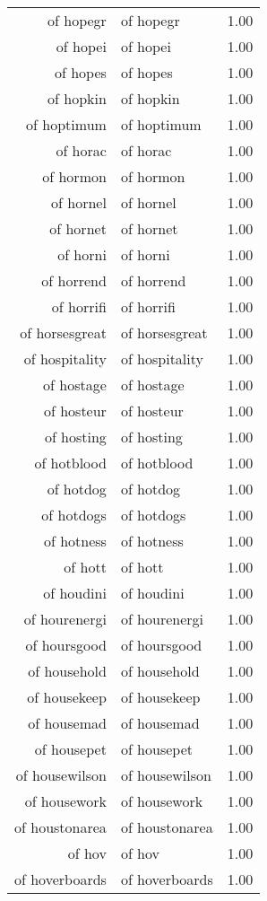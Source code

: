 \begin{table}[ht]
\begin{tabular}{rlr}
  of hopegr & of hopegr & 1.00 \\ 
  of hopei & of hopei & 1.00 \\ 
  of hopes & of hopes & 1.00 \\ 
  of hopkin & of hopkin & 1.00 \\ 
  of hoptimum & of hoptimum & 1.00 \\ 
  of horac & of horac & 1.00 \\ 
  of hormon & of hormon & 1.00 \\ 
  of hornel & of hornel & 1.00 \\ 
  of hornet & of hornet & 1.00 \\ 
  of horni & of horni & 1.00 \\ 
  of horrend & of horrend & 1.00 \\ 
  of horrifi & of horrifi & 1.00 \\ 
  of horsesgreat & of horsesgreat & 1.00 \\ 
  of hospitality & of hospitality & 1.00 \\ 
  of hostage & of hostage & 1.00 \\ 
  of hosteur & of hosteur & 1.00 \\ 
  of hosting & of hosting & 1.00 \\ 
  of hotblood & of hotblood & 1.00 \\ 
  of hotdog & of hotdog & 1.00 \\ 
  of hotdogs & of hotdogs & 1.00 \\ 
  of hotness & of hotness & 1.00 \\ 
  of hott & of hott & 1.00 \\ 
  of houdini & of houdini & 1.00 \\ 
  of hourenergi & of hourenergi & 1.00 \\ 
  of hoursgood & of hoursgood & 1.00 \\ 
  of household & of household & 1.00 \\ 
  of housekeep & of housekeep & 1.00 \\ 
  of housemad & of housemad & 1.00 \\ 
  of housepet & of housepet & 1.00 \\ 
  of housewilson & of housewilson & 1.00 \\ 
  of housework & of housework & 1.00 \\ 
  of houstonarea & of houstonarea & 1.00 \\ 
  of hov & of hov & 1.00 \\ 
  of hoverboards & of hoverboards & 1.00 \\ 

\end{tabular}
\end{table}
